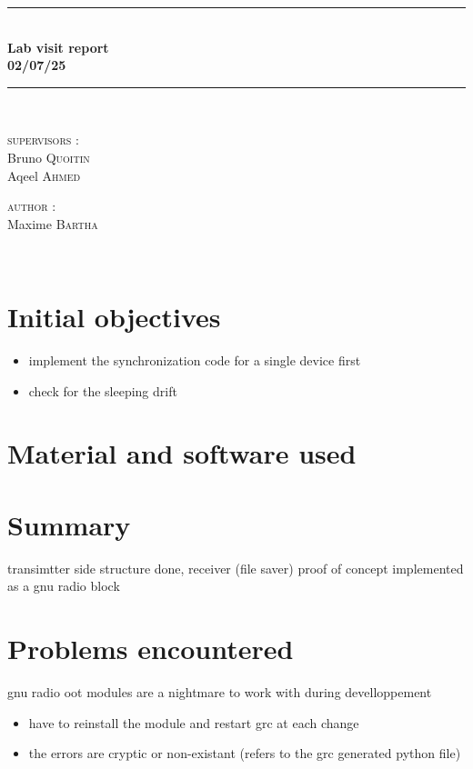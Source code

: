 \documentclass[a4paper, 12pt]{article}
\newcommand{\HRule}{\rule{\linewidth}{0.3mm}}
\begin{document}
\begin{center}
\HRule \\[0.3cm]
{ \LARGE \bfseries Lab visit report \\[0.3cm]}
{ \LARGE \bfseries 02/07/25 \\[0.1cm]} %
\HRule \\[1.5cm]

\begin{minipage}[t]{0.45\textwidth}
\begin{flushleft} \large
\textsc{supervisors :}\\
Bruno \textsc{Quoitin}\\
Aqeel \textsc{Ahmed}\\
\end{flushleft}

\end{minipage}
\begin{minipage}[t]{0.45\textwidth}
\begin{flushright} \large
\textsc{author :}\\
Maxime \textsc{Bartha}\\
\end{flushright}
\end{minipage}\\[2ex]
\end{center}


\section{Initial objectives}
\begin{itemize}
  \item implement the synchronization code for a single device first 
  \item check for the sleeping drift 
\end{itemize}

\section{Material and software used}

\section{Summary}
transimtter side structure done, 
receiver (file saver) proof of concept implemented as a gnu radio block

\section{Problems encountered} 
gnu radio oot modules are a nightmare to work with during develloppement 
\begin{itemize}
  \item have to reinstall the module and restart grc at each change
  \item the errors are cryptic or non-existant (refers to the grc generated python file)
\end{itemize}
\end{document}
